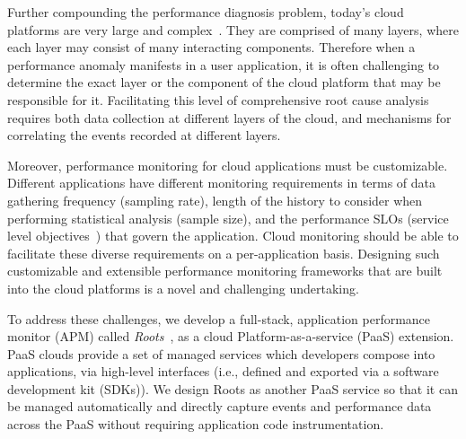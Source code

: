 Further compounding the performance
diagnosis problem, today's cloud platforms are very 
large and complex~\cite{DaCunhaRodrigues:2016:MCC:2851613.2851619,Ibidunmoye:2015:PAD:2808687.2791120}. 
They are
comprised of many layers, where each layer may consist of many interacting components.
Therefore when a performance anomaly manifests in a user application, it is
often challenging
to determine the exact layer or the component of the cloud platform that may be responsible for it. 
Facilitating this level of comprehensive root cause analysis requires
both data collection at different layers of the cloud, and mechanisms for correlating 
the events recorded at different layers. 

Moreover, performance monitoring for cloud applications must be customizable. Different
applications have different monitoring requirements in terms of data gathering frequency (sampling rate), 
length of the history to consider when performing statistical analysis (sample size), and the performance 
SLOs (service level objectives~\cite{Keller:2003:WFS:635430.635442}) that govern the application.
Cloud monitoring should be able to facilitate these diverse requirements on a
per-application basis.
Designing such customizable and extensible performance
monitoring frameworks that are built into the cloud platforms is a novel and challenging undertaking.

To address these challenges, we develop 
a full-stack, application performance
monitor (APM) called \textit{Roots}~\cite{Jayathilaka:2017:PMR:3038912.3052649}, as a cloud Platform-as-a-service (PaaS) extension.
PaaS clouds provide 
a set of managed services which developers compose into applications, 
via high-level interfaces (i.e., defined and exported via
a software development kit (SDKs)).
We design Roots as another PaaS service so that it can be
managed automatically and 
directly capture events and performance data across the PaaS without
requiring application code instrumentation.

